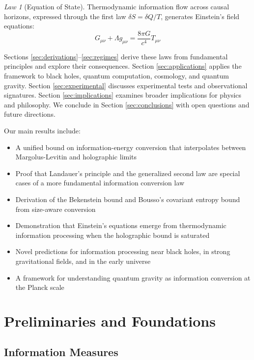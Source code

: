 \documentclass[11pt,a4paper]{article}
\theoremstyle{plain}
\theoremstyle{definition}
\theoremstyle{remark}
\newtheorem{law}{Law}
\begin{document}
\begin{law}[Equation of State]
Thermodynamic information flow across causal horizons, expressed through the first law $\delta S = \delta Q/T$, generates Einstein's field equations:
\begin{equation}
G_{\mu\nu} + \Lambda g_{\mu\nu} = \frac{8\pi G}{c^4}T_{\mu\nu}
\label{eq:law4}
\end{equation}
\end{law}

Sections \ref{sec:derivations}--\ref{sec:regimes} derive these laws from fundamental principles and explore their consequences. Section \ref{sec:applications} applies the framework to black holes, quantum computation, cosmology, and quantum gravity. Section \ref{sec:experimental} discusses experimental tests and observational signatures. Section \ref{sec:implications} examines broader implications for physics and philosophy. We conclude in Section \ref{sec:conclusions} with open questions and future directions.

Our main results include:

\begin{itemize}[leftmargin=*]
\item A unified bound on information-energy conversion that interpolates between Margolus-Levitin and holographic limits
\item Proof that Landauer's principle and the generalized second law are special cases of a more fundamental information conversion law
\item Derivation of the Bekenstein bound and Bousso's covariant entropy bound from size-aware conversion
\item Demonstration that Einstein's equations emerge from thermodynamic information processing when the holographic bound is saturated
\item Novel predictions for information processing near black holes, in strong gravitational fields, and in the early universe
\item A framework for understanding quantum gravity as information conversion at the Planck scale
\end{itemize}

\section{Preliminaries and Foundations}
\label{sec:preliminaries}

\subsection{Information Measures}
\end{document}
